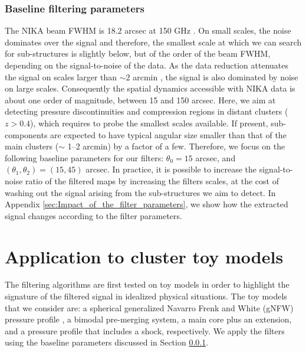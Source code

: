 \documentclass[twocolumn,traditabstract]{aa}
\begin{document}
\subsubsection{Baseline filtering parameters}\label{sec:Baseline_filtering_parameters}
The NIKA beam FWHM is 18.2 arcsec at 150 GHz \citep{Catalano2014}. On small scales, the noise dominates over the signal and therefore, the smallest scale at which we can search for sub-structures is slightly below, but of the order of the beam FWHM, depending on the signal-to-noise of the data. As the data reduction attenuates the signal on scales larger than $\sim 2$ arcmin \citep[see][and Section \ref{sec:Systematics_and_noise_properties}]{Adam2015}, the signal is also dominated by noise on large scales. Consequently the spatial dynamics accessible with NIKA data is about one order of magnitude, between 15 and 150 arcsec. Here, we aim at detecting pressure discontinuities and compression regions in distant clusters ($z>0.4$), which requires to probe the smallest scales available. If present, sub-components are expected to have typical angular size smaller than that of the main clusters ($\sim$ 1--2 arcmin) by a factor of a few. Therefore, we focus on the following baseline parameters for our filters: $\theta_0 = 15$ arcsec, and $\left(\theta_1, \theta_2\right) = \left(15, 45\right)$ arcsec. In practice, it is possible to increase the signal-to-noise ratio of the filtered maps by increasing the filters scales, at the cost of washing out the signal arising from the sub-structures we aim to detect. In Appendix \ref{sec:Impact_of_the_filter_parameters}, we show how the extracted signal changes according to the filter parameters.

\section{Application to cluster toy models}\label{sec:Application_to_toy_models}
The filtering algorithms are first tested on toy models in order to highlight the signature of the filtered signal in idealized physical situations. The toy models that we consider are: a spherical generalized Navarro Frenk and White (gNFW) pressure profile \citep{Nagai2007}, a bimodal pre-merging system, a main core plus an extension, and a pressure profile that includes a shock, respectively. We apply the filters using the baseline parameters discussed in Section \ref{sec:Baseline_filtering_parameters}.
\end{document}

